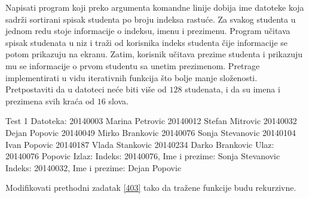 \begin{Answer}[ref=402]
\end{Answer}
\begin{Exercise}[label=403]
  Napisati program koji preko argumenta komandne linije dobija ime
  datoteke koja sadrži sortirani spisak studenta po broju indeksa
  rastuće. Za svakog studenta u jednom redu stoje informacije o
  indeksu, imenu i prezimenu.  Program učitava spisak studenata u niz
  i traži od korisnika indeks studenta čije informacije se potom
  prikazuju na ekranu.  Zatim, korisnik učitava prezime studenta i
  prikazuju mu se informacije o prvom studentu sa unetim prezimenom.
  Pretrage implementirati u vidu iterativnih funkcija što bolje manje
  složenosti. Pretpostaviti da u datoteci neće biti više od $128$
  studenata, i da su imena i prezimena svih kraća od $16$ slova.
  
\begin{maxitest}
\begin{test}{Test 1}
Datoteka:
  20140003 Marina Petrovic
  20140012 Stefan Mitrovic
  20140032 Dejan Popovic
  20140049 Mirko Brankovic
  20140076 Sonja Stevanovic
  20140104 Ivan Popovic
  20140187 Vlada Stankovic
  20140234 Darko Brankovic
Ulaz:
  20140076
  Popovic
Izlaz:
  Indeks: 20140076, Ime i prezime: Sonja Stevanovic
  Indeks: 20140032, Ime i prezime: Dejan Popovic
\end{test}
\end{maxitest}


\end{Exercise}

\begin{Answer}[ref=403]
\end{Answer}
\begin{Exercise}[label=404]
  Modifikovati prethodni zadatak \ref{403} tako da tražene funkcije
  budu rekurzivne.


\end{Exercise}

